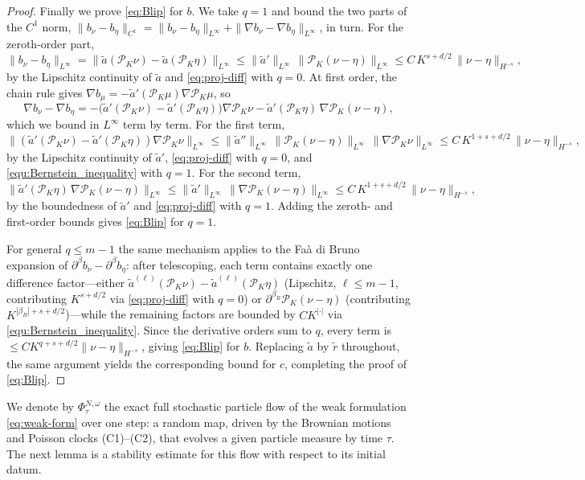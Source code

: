 \documentclass[a4paper,fleqn]{cas-sc}
\theoremstyle{definition}
\theoremstyle{remark}
\begin{document}
\begin{proof}
Finally we prove \eqref{eq:Blip} for $b$. We take $q=1$ and
bound the two parts of the $C^1$ norm,
$\|b_\nu-b_\eta\|_{C^1}=\|b_\nu-b_\eta\|_{L^\infty}+\|\nabla b_\nu-\nabla b_\eta\|_{L^\infty}$,
in turn. For the zeroth-order part,
\[
\|b_\nu-b_\eta\|_{L^\infty}
=\|\tilde a(\mathcal P_K\nu)-\tilde a(\mathcal P_K\eta)\|_{L^\infty}
\le\|\tilde a'\|_{L^\infty}\,\|\mathcal P_K(\nu-\eta)\|_{L^\infty}
\le C\,K^{s+d/2}\,\|\nu-\eta\|_{H^{-s}},
\]
by the Lipschitz continuity of $\tilde a$ and \eqref{eq:proj-diff} with $q=0$.
At first order, the chain rule gives
$\nabla b_\mu=-\tilde a'(\mathcal P_K\mu)\nabla\mathcal P_K\mu$, so
\[
\nabla b_\nu-\nabla b_\eta
=-\bigl(\tilde a'(\mathcal P_K\nu)-\tilde a'(\mathcal P_K\eta)\bigr)\nabla\mathcal P_K\nu
 -\tilde a'(\mathcal P_K\eta)\,\nabla\mathcal P_K(\nu-\eta),
\]
which we bound in $L^\infty$ term by term. For the first term,
\[
\bigl\|(\tilde a'(\mathcal P_K\nu)-\tilde a'(\mathcal P_K\eta))\nabla\mathcal P_K\nu\bigr\|_{L^\infty}
\le\|\tilde a''\|_{L^\infty}\,\|\mathcal P_K(\nu-\eta)\|_{L^\infty}\,
   \|\nabla\mathcal P_K\nu\|_{L^\infty}
\le C\,K^{1+s+d/2}\,\|\nu-\eta\|_{H^{-s}},
\]
by the Lipschitz continuity of $\tilde a'$, \eqref{eq:proj-diff} with $q=0$, and
\eqref{equ:Bernstein_inequality} with $q=1$. For the second term,
\[
\bigl\|\tilde a'(\mathcal P_K\eta)\,\nabla\mathcal P_K(\nu-\eta)\bigr\|_{L^\infty}
\le\|\tilde a'\|_{L^\infty}\,\|\nabla\mathcal P_K(\nu-\eta)\|_{L^\infty}
\le C\,K^{1+s+d/2}\,\|\nu-\eta\|_{H^{-s}},
\]
by the boundedness of $\tilde a'$ and \eqref{eq:proj-diff} with $q=1$. Adding
the zeroth- and first-order bounds gives \eqref{eq:Blip} for $q=1$.

For general $q\le m-1$ the same mechanism applies to the Fa\`a di Bruno expansion
of $\partial^\beta b_\nu-\partial^\beta b_\eta$: after telescoping, each term
contains exactly one difference factor---either
$\tilde a^{(\ell)}(\mathcal P_K\nu)-\tilde a^{(\ell)}(\mathcal P_K\eta)$ (Lipschitz,
$\ell\le m-1$, contributing $K^{s+d/2}$ via \eqref{eq:proj-diff} with $q=0$) or
$\partial^{\beta_B}\mathcal P_K(\nu-\eta)$ (contributing $K^{|\beta_B|+s+d/2}$)---while
the remaining factors are bounded by $CK^{|\cdot|}$ via
\eqref{equ:Bernstein_inequality}. Since the derivative orders sum to $q$, every
term is $\le CK^{q+s+d/2}\|\nu-\eta\|_{H^{-s}}$, giving \eqref{eq:Blip} for $b$.
Replacing $\tilde a$ by $\tilde r$ throughout, the same argument yields the
corresponding bound for $c$, completing the proof of \eqref{eq:Blip}.
\end{proof}

We denote by $\Phi^{N,\omega}_\tau$ the exact full stochastic particle flow of the
weak formulation \eqref{eq:weak-form} over one step: a random map, driven by the
Brownian motions and Poisson clocks (C1)--(C2), that evolves a given particle
measure by time $\tau$. The next lemma is a stability estimate for this flow with
respect to its initial datum.
\end{document}
